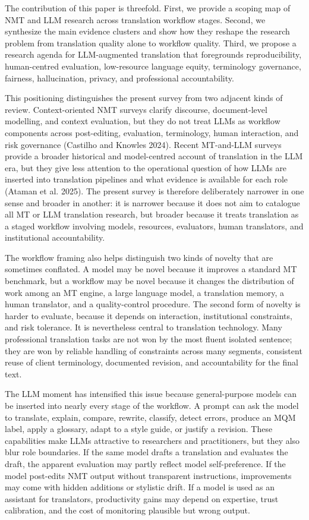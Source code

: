 \documentclass[11pt]{article}
\begin{document}
The contribution of this paper is threefold. First, we provide a scoping map of NMT and LLM research across translation workflow stages. Second, we synthesize the main evidence clusters and show how they reshape the research problem from translation quality alone to workflow quality. Third, we propose a research agenda for LLM-augmented translation that foregrounds reproducibility, human-centred evaluation, low-resource language equity, terminology governance, fairness, hallucination, privacy, and professional accountability.

This positioning distinguishes the present survey from two adjacent kinds of review. Context-oriented NMT surveys clarify discourse, document-level modelling, and context evaluation, but they do not treat LLMs as workflow components across post-editing, evaluation, terminology, human interaction, and risk governance (Castilho and Knowles 2024). Recent MT-and-LLM surveys provide a broader historical and model-centred account of translation in the LLM era, but they give less attention to the operational question of how LLMs are inserted into translation pipelines and what evidence is available for each role (Ataman et al. 2025). The present survey is therefore deliberately narrower in one sense and broader in another: it is narrower because it does not aim to catalogue all MT or LLM translation research, but broader because it treats translation as a staged workflow involving models, resources, evaluators, human translators, and institutional accountability.


The workflow framing also helps distinguish two kinds of novelty that are sometimes conflated. A model may be novel because it improves a standard MT benchmark, but a workflow may be novel because it changes the distribution of work among an MT engine, a large language model, a translation memory, a human translator, and a quality-control procedure. The second form of novelty is harder to evaluate, because it depends on interaction, institutional constraints, and risk tolerance. It is nevertheless central to translation technology. Many professional translation tasks are not won by the most fluent isolated sentence; they are won by reliable handling of constraints across many segments, consistent reuse of client terminology, documented revision, and accountability for the final text.

The LLM moment has intensified this issue because general-purpose models can be inserted into nearly every stage of the workflow. A prompt can ask the model to translate, explain, compare, rewrite, classify, detect errors, produce an MQM label, apply a glossary, adapt to a style guide, or justify a revision. These capabilities make LLMs attractive to researchers and practitioners, but they also blur role boundaries. If the same model drafts a translation and evaluates the draft, the apparent evaluation may partly reflect model self-preference. If the model post-edits NMT output without transparent instructions, improvements may come with hidden additions or stylistic drift. If a model is used as an assistant for translators, productivity gains may depend on expertise, trust calibration, and the cost of monitoring plausible but wrong output.
\end{document}
